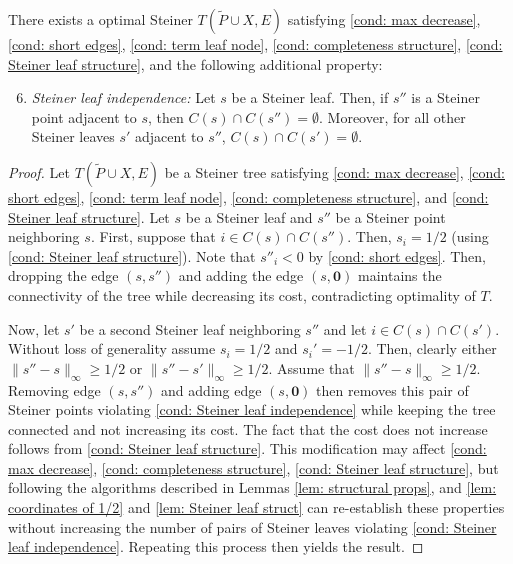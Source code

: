 \documentclass{theoretics}
\newcommand{\1}{\textbf{1}}
\renewcommand{\tilde}{\widetilde}
\begin{document}
\begin{lemma} \label{lem: Steiner leaf independent neigbors}
There exists a optimal Steiner  $T(\tilde{P} \cup X, E)$ satisfying \ref{cond: max decrease}, \ref{cond: short edges}, \ref{cond: term leaf node}, \ref{cond: completeness structure}, \ref{cond: Steiner leaf structure}, and the following additional property:
\begin{enumerate}[label=(P\arabic*)]
\setcounter{enumi}{5}
    \item \textit{Steiner leaf independence:}
    Let $s$ be a Steiner leaf. Then, if $s''$ is a Steiner point adjacent to $s$, then $C(s) \cap C(s'') = \emptyset$. Moreover, for all other Steiner leaves $s'$ adjacent to $s''$, $C(s) \cap C(s') = \emptyset$. \label{cond: Steiner leaf independence}
\end{enumerate}
\end{lemma}
\begin{proof}
Let $T(\tilde{P} \cup X, E)$ be a Steiner tree satisfying \ref{cond: max decrease}, \ref{cond: short edges}, \ref{cond: term leaf node},  \ref{cond: completeness structure}, and \ref{cond: Steiner leaf structure}. Let $s$ be a Steiner leaf and $s''$ be a Steiner point neighboring $s$. First, suppose that $i \in C(s) \cap C(s'')$. Then, $s_i = 1/2$ (using \ref{cond: Steiner leaf structure}). Note that $s''_i < 0$ by \ref{cond: short edges}. Then, dropping the edge $(s, s'')$ and adding the edge $(s, \mathbf{0})$ maintains the connectivity of the tree while decreasing its cost, contradicting optimality of $T$.


Now, let $s'$ be a second Steiner leaf neighboring $s''$ and let $i \in C(s) \cap C(s')$. Without loss of generality assume $s_i = 1/2$ and $s_i' = -1/2$. Then, clearly either $\|s'' - s\|_{\infty} \geq 1/2$ or $\|s'' - s'\|_{\infty} \geq 1/2$. Assume that $\|s'' - s\|_{\infty} \geq 1/2$. Removing edge $(s, s'')$ and adding edge $(s, \mathbf{0})$ then removes this pair of Steiner points violating \ref{cond: Steiner leaf independence} while keeping the tree connected and not increasing its cost.  The fact that the cost does not increase follows from \ref{cond: Steiner leaf structure}. This modification may affect \ref{cond: max decrease}, \ref{cond: completeness structure}, \ref{cond: Steiner leaf structure}, but following the algorithms described in Lemmas \ref{lem: structural props}, and \ref{lem: coordinates of 1/2} and \ref{lem: Steiner leaf struct} can re-establish these properties without increasing the number of pairs of Steiner leaves violating \ref{cond: Steiner leaf independence}. Repeating this process then yields the result.
\end{proof}
\end{document}
